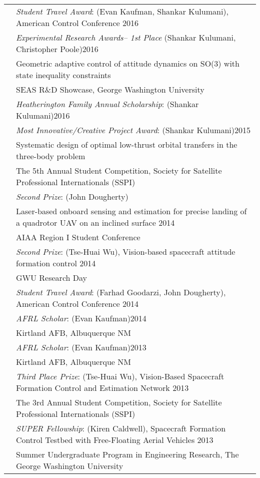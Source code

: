 \documentclass[10pt]{article}
\begin{document}
\begin{tabularx}{\textwidth}{>{\setlength{\hsize}{0.5cm}}X X}
& \textit{Student Travel Award}: (Evan Kaufman, Shankar Kulumani), {American Control Conference} \hfill 2016
\\[0.2cm]


& \textit{Experimental Research Awards-- 1st Place} (Shankar Kulumani, Christopher Poole)\hfill 2016\\
& Geometric adaptive control of attitude dynamics on SO(3) with state inequality constraints\\
& SEAS R\&D Showcase, George Washington University\\[0.2cm]


& \textit{Heatherington Family Annual Scholarship}: (Shankar Kulumani)\hfill 2016\\[0.2cm]

& \textit{Most Innovative/Creative Project Award}: (Shankar Kulumani)\hfill 2015\\
& {Systematic design of optimal low-thrust orbital transfers in the three-body problem}\\
& The 5th Annual Student Competition, Society for Satellite Professional Internationals (SSPI)\\[0.2cm]

& \textit{Second Prize}: (John Dougherty)\\
& {Laser-based onboard sensing and estimation for precise landing of a quadrotor UAV on an inclined surface} \hfill 2014\\
& AIAA Region I Student Conference\\[0.2cm]

& \textit{Second Prize}: (Tse-Huai Wu), {Vision-based spacecraft attitude formation control} \hfill 2014\\
& GWU Research Day\\[0.2cm]

& \textit{Student Travel Award}: (Farhad Goodarzi, John Dougherty), {American Control Conference} \hfill 2014\\[0.2cm]

& \textit{AFRL Scholar}: (Evan Kaufman)\hfill 2014\\
& Kirtland AFB, Albuquerque NM\\[0.2cm]

& \textit{AFRL Scholar}: (Evan Kaufman)\hfill 2013\\
& Kirtland AFB, Albuquerque NM\\[0.2cm]

& \textit{Third Place Prize}: (Tse-Huai Wu), {Vision-Based Spacecraft Formation Control and Estimation Network} \hfill 2013\\
& The 3rd Annual Student Competition, Society for Satellite Professional Internationals (SSPI)\\[0.2cm]

& \textit{SUPER Fellowship}: (Kiren Caldwell), {Spacecraft Formation Control Testbed
with Free-Floating Aerial Vehicles} \hfill 2013\\
& Summer Undergraduate Program in Engineering Research, The George Washington University\vspace*{0.08cm}\\
\end{tabularx}
\end{document}
